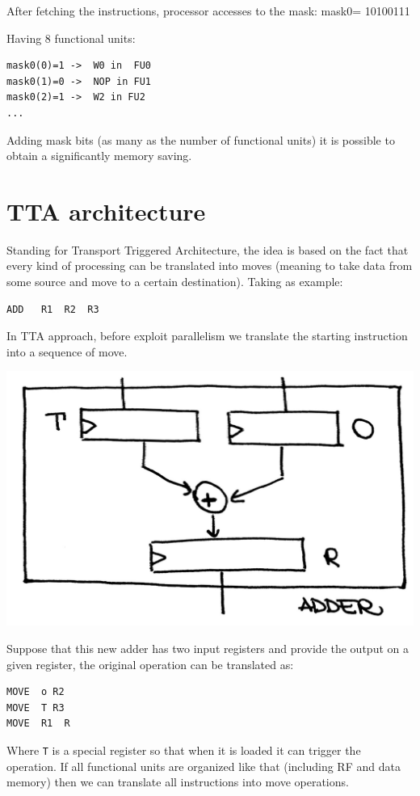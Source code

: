 After fetching the instructions, processor accesses to the mask:
mask0= 10100111

Having 8 functional units:

\begin{verbatim}
mask0(0)=1 ->  W0 in  FU0
mask0(1)=0 ->  NOP in FU1
mask0(2)=1 ->  W2 in FU2
...
\end{verbatim}

Adding mask bits (as many as the number of functional units) it is possible to obtain a significantly memory saving.

\section{TTA architecture}

Standing for Transport Triggered Architecture, the idea is based on the fact that every kind of processing can be translated into moves (meaning to take data from some source and move to a certain destination). Taking as example:

\begin{verbatim}
ADD   R1  R2  R3
\end{verbatim}

In TTA approach, before exploit parallelism we translate the starting instruction into a sequence of move.

\begin{center}
  \includegraphics[width=0.5\linewidth]{img/img3/7}
\end{center}

Suppose that this new adder has two input registers and provide the output on a given register, the original operation can be translated as:
\begin{verbatim}
MOVE  o R2
MOVE  T R3
MOVE  R1  R
\end{verbatim}

Where \verb|T| is a special register so that when it is loaded it can trigger the operation. If all functional units are organized like that (including RF and data memory) then we can translate all instructions into move operations.\\


